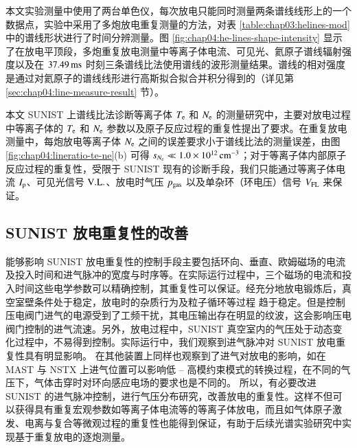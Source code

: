 本文实验测量中使用了两台单色仪，每次放电只能同时测量两条谱线线形上的一个数据点，实验中采用了多炮放电重复测量的方法，对表 \ref{table:chap03:helines-mod} 中的谱线形状进行了时间分辨测量。图 \ref{fig:chap04:he-lines-shape-intensity} 显示了在放电平顶段，多炮重复放电测量中等离子体电流、可见光、氦原子谱线辐射强度以及在 $37.49\,{\rm ms}$ 时刻三条谱线比法使用谱线的波形测量结果。谱线的相对强度是通过对氦原子的谱线线形进行高斯拟合拟合并积分得到的（详见第 \ref{sec:chap04:line-measure-result} 节）。

本文 SUNIST 上谱线比法诊断等离子体 $T_{\rm e}$ 和 $N_{\rm e}$ 的测量研究中，主要对放电过程中等离子体的 $T_{\rm e}$ 和 $N_{\rm e}$ 参数以及原子反应过程的重复性提出了要求。在重复放电测量中，每炮放电等离子体 $N_{\rm e}$ 之间的误差要求小于谱线比法的测量误差，由图 \ref{fig:chap04:lineratio-te-ne}(b) 可得 $s_{N_{\rm e}}\ll 1.0\times10^{12}\,{\rm cm}^{-3}$；对于等离子体内部原子反应过程的重复性，受限于 SUNIST 现有的诊断手段，我们只能通过等离子体电流 $I_{\rm p}$、可见光信号 ${\rm V.L.}$、放电时气压 $p_{\rm gas}$ 以及单杂环（环电压）信号 $V_{\rm FL}$ 来保证。

\graphicspath{{figures/appendix-gaspuffing/}}
\subsection{SUNIST 放电重复性的改善}
\label{sec:chap04:gas-puffing-for-repeatability}

能够影响 SUNIST 放电重复性的控制手段主要包括环向、垂直、欧姆磁场的电流及投入时间和进气脉冲的宽度与时序等。在实际运行过程中，三个磁场的电流和投入时间这些电学参数可以精确控制，其重复性可以保证。经充分地放电锻炼后，真空室壁条件处于稳定，放电时的杂质行为及粒子循环等过程\cite{Belyakov2003:InpurityToPlasma:TRANSMAK} 趋于稳定。但是控制压电阀门进气的电源受到了工频干扰，其电压输出存在明显的纹波，这会影响压电阀门控制的进气流速。另外，放电过程中，SUNIST 真空室内的气压处于动态变化过程中，不易得到控制。实际运行中，我们观察到进气脉冲对 SUNIST 放电重复性具有明显影响\cite{TanYi2011:NF:ECR,HeYexi2006:PST:startup}。 在其他装置上同样也观察到了进气对放电的影响，如在 MAST\cite{Carolan:2002:MASTgaspufftoLHmode} 与 NSTX\cite{Maingi2004:PPCF:NSTXgaspufftoLHmode} 上进气位置可以影响低 -- 高模约束模式的转换过程，在不同的气压下，气体击穿时对环向感应电场的要求也是不同的\cite{Chattopa1996:SINP:breakdown,Antonio2001:TCABR:breakdown}。 所以，有必要改进 SUNIST 的进气脉冲控制，进行气压分布研究，改善放电的重复性\cite{xie:pst}。这样不但可以获得具有重复宏观参数\pozhehao 如等离子体电流等\pozhehao 的等离子体放电，而且如气体原子激发、电离与复合等微观过程的重复性也能得到保证，有助于后续光谱实验研究中实现基于重复放电的逐炮测量。

